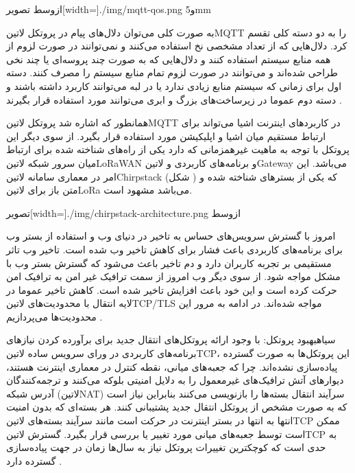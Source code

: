 ‌ازوسط
‌تصویر[width=\textwidth]{./img/mqtt-qos.png}
‌و{5mm}

به صورت کلی می‌توان دلال‌های پیام در پروتکل ‌لاتین{MQTT} را به دو دسته کلی تقسم کرد. دلال‌هایی که از تعداد مشخصی نخ استفاده می‌کنند و نمی‌توانند در صورت لزوم از همه منابع سیستم استفاده کنند و دلال‌هایی که به صورت چند پروسه‌ای یا چند نخی طراحی شده‌اند
و می‌توانند در صورت لزوم تمام منابع سیستم را مصرف کنند. دسته اول برای زمانی که سیستم منابع زیادی ندارد یا در لبه می‌توانند کاربرد داشته باشند و دسته دوم عموما در زیرساخت‌های بزرگ و ابری می‌توانند مورد استفاده قرار بگیرند
.

همانطور که اشاره شد پروتکل ‌لاتین{MQTT} در کاربردهای اینترنت اشیا می‌تواند برای ارتباط مستقیم میان اشیا و اپلیکیشن مورد استفاده قرار بگیرد. از سوی دیگر این پروتکل با توجه به ماهیت غیرهمزمانی که دارد یکی از راه‌های شناخته شده برای ارتباط میان سرور شبکه ‌لاتین{LoRaWAN}
و برنامه‌های کاربردی و ‌لاتین{Gateway} می‌باشد. این امر در معماری سامانه ‌لاتین{Chirpstack} (شکل ) که یکی از بسترهای شناخته شده و متن باز برای ‌لاتین{LoRa} می‌باشد مشهود است.

‌تصویر[width=\textwidth]{./img/chirpstack-architecture.png}
‌ازوسط


امروز با گسترش سرویس‌های حساس به تاخیر در دنیای وب و استفاده از بستر وب برای برنامه‌های کاربردی باعث فشار برای کاهش تاخیر وب شده است. تاخیر وب تاثر مستقیمی بر تجربه کاربران دارد
و دم تاخیر باعث می‌شود که گسترش بستر وب با مشکل مواجه شود.
از سوی دیگر وب امروز از سمت ترافیک غیر امن به ترافیک امن حرکت کرده است و این خود باعث افزایش تاخیر شده است.
کاهش تاخیر عموما در لایه انتقال با محدودیت‌های ‌لاتین{TCP/TLS} مواجه شده‌اند. در ادامه به مرور این محدودیت‌ها می‌پردازیم
.

‌سیاه{بهبود پروتکل}: با وجود ارائه پروتکل‌های انتقال جدید برای برآورده کردن نیازهای برنامه‌های کاربردی در ورای سرویس ساده ‌لاتین{TCP}، این پروتکل‌ها به صورت گسترده پیاده‌سازی نشده‌اند.
چرا که جعبه‌های میانی، نقطه کنترل در معماری اینترنت هستند، دیوارهای آتش ترافیک‌های غیرمعمول را به دلایل امنیتی بلوکه می‌کنند و ترجمه‌کنندگان آدرس شبکه (‌لاتین{NAT})
سرآیند انتقال بسته‌ها را بازنویسی می‌کنند بنابراین نیاز است که به صورت مشخص از پروتکل انتقال جدید پشتیبانی کنند.
هر بسته‌ای که بدون امنیت انتها به انتها در بستر اینترنت در حرکت است مانند سرآیند بسته‌های ‌لاتین{TCP} ممکن است توسط جعبه‌های میانی مورد تغییر یا بررسی قرار بگیرد.
گسترش ‌لاتین{TCP} به حدی است که کوچکترین تغییرات پروتکل نیاز به سال‌ها زمان در جهت پیاده‌سازی گسترده دارد
.

